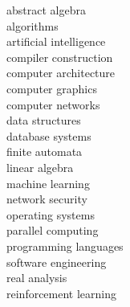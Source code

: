 \begin{minipage}[t]{0.22\textwidth}
abstract algebra \\
algorithms \\
artificial intelligence\\
compiler construction\\
computer architecture \\
computer graphics \\
computer networks \\
data structures \\
database systems \\
finite automata \\
linear algebra \\
machine learning \\
network security \\
operating systems \\
parallel computing \\
programming languages \\ 
software engineering \\
real analysis\\
reinforcement learning\\



\sectionspace






\end{minipage} %
\hfill
%

